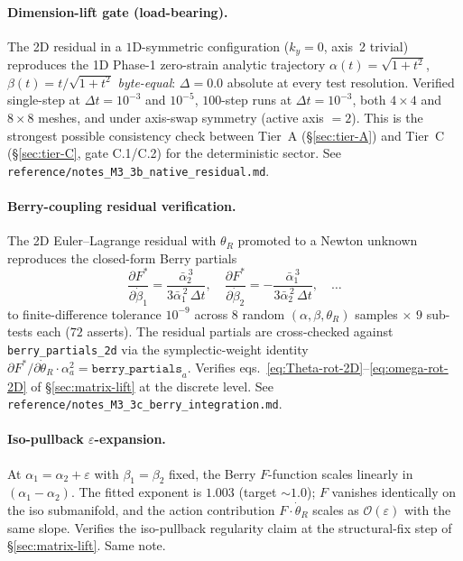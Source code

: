 \documentclass[11pt]{article}
\begin{document}
\paragraph{Dimension-lift gate (load-bearing).} The 2D residual
in a $1$D-symmetric configuration ($k_y = 0$, axis~2 trivial)
reproduces the 1D Phase-1 zero-strain analytic trajectory
$\alpha(t) = \sqrt{1+t^2}$, $\beta(t) = t/\sqrt{1+t^2}$
\emph{byte-equal}: $\Delta = 0.0$ absolute at every test
resolution. Verified single-step at $\Delta t = 10^{-3}$ and
$10^{-5}$, $100$-step runs at $\Delta t = 10^{-3}$, both $4\times
4$ and $8\times 8$ meshes, and under axis-swap symmetry (active
axis $= 2$). This is the strongest possible consistency check
between Tier~A (\S\ref{sec:tier-A}) and Tier~C
(\S\ref{sec:tier-C}, gate C.1/C.2) for the deterministic
sector. See \verb|reference/notes_M3_3b_native_residual.md|.

\paragraph{Berry-coupling residual verification.} The 2D
Euler--Lagrange residual with $\theta_R$ promoted to a Newton
unknown reproduces the closed-form Berry partials
\[
\frac{\partial F^*}{\partial\dot\beta_1} =
\frac{\bar\alpha_2^{\,3}}{3\bar\alpha_1^{\,2}\,\Delta t}, \quad
\frac{\partial F^*}{\partial\dot\beta_2} =
-\frac{\bar\alpha_1^{\,3}}{3\bar\alpha_2^{\,2}\,\Delta t}, \quad
\dots
\]
to finite-difference tolerance $10^{-9}$ across $8$ random
$(\alpha,\beta,\theta_R)$ samples $\times$ $9$ sub-tests each
($72$ asserts). The residual partials are cross-checked against
\texttt{berry\_partials\_2d} via the symplectic-weight identity
$\partial F^*/\partial \dot\theta_R \cdot \alpha_a^2 =
\texttt{berry\_partials}_a$. Verifies eqs.\
\eqref{eq:Theta-rot-2D}--\eqref{eq:omega-rot-2D} of
\S\ref{sec:matrix-lift} at the discrete level. See
\verb|reference/notes_M3_3c_berry_integration.md|.

\paragraph{Iso-pullback $\varepsilon$-expansion.} At
$\alpha_1 = \alpha_2 + \varepsilon$ with $\beta_1 = \beta_2$
fixed, the Berry $F$-function scales linearly in $(\alpha_1 -
\alpha_2)$. The fitted exponent is $1.003$ (target $\sim 1.0$);
$F$ vanishes identically on the iso submanifold, and the action
contribution $F\cdot\dot\theta_R$ scales as $\mathcal O(\varepsilon)$
with the same slope. Verifies the iso-pullback regularity claim
at the structural-fix step of \S\ref{sec:matrix-lift}. Same
note.
\end{document}
